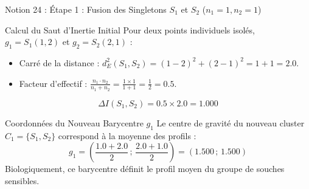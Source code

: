 \documentclass[aspectratio=169,10pt]{beamer}
\begin{document}
\begin{frame}{Notion 24 : Étape 1 : Fusion des Singletons $S_1$ et $S_2$ ($n_1 = 1, n_2 = 1$)}
  \begin{conceptbox}{Calcul du Saut d'Inertie Initial}
    \footnotesize
    Pour deux points individuels isolés, $g_1 = S_1(1,2)$ et $g_2 = S_2(2,1)$ :
    \begin{itemize}
      \item Carré de la distance : $d_E^2(S_1, S_2) = (1 - 2)^2 + (2 - 1)^2 = 1 + 1 = 2.0$.
      \item Facteur d'effectif : $\frac{n_1 \cdot n_2}{n_1 + n_2} = \frac{1 \times 1}{1 + 1} = \frac{1}{2} = 0.5$.
    \end{itemize}
    \begin{equation*}
      \Delta I(S_1, S_2) = 0.5 \times 2.0 = \mathbf{1.000}
    \end{equation*}
  \end{conceptbox}
  \vspace{1mm}
  \begin{biobox}{Coordonnées du Nouveau Barycentre $g_1$}
    \footnotesize
    Le centre de gravité du nouveau cluster $C_1 = \{S_1, S_2\}$ correspond à la moyenne des profils :
    \begin{equation*}
      g_1 = \left( \frac{1.0 + 2.0}{2} \,;\, \frac{2.0 + 1.0}{2} \right) = (\mathbf{1.500} \,;\, \mathbf{1.500})
    \end{equation*}
    Biologiquement, ce barycentre définit le profil moyen du groupe de souches sensibles.
  \end{biobox}
\end{frame}
\end{document}
